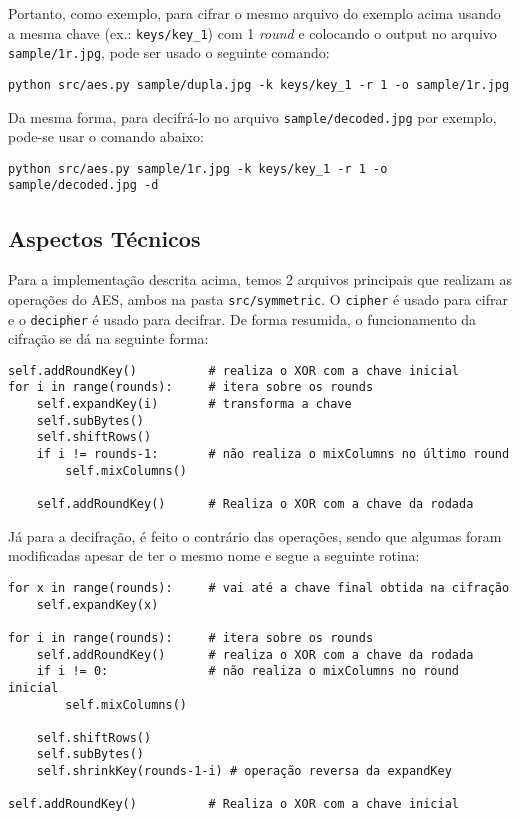 \documentclass[12pt]{article}
\begin{document}
Portanto, como exemplo, para cifrar o mesmo arquivo do exemplo acima usando a mesma chave (ex.: \texttt{keys/key\_1}) com 1 \textit{round} e colocando o output no arquivo \texttt{sample/1r.jpg}, pode ser usado o seguinte comando:

\begin{lstlisting}
python src/aes.py sample/dupla.jpg -k keys/key_1 -r 1 -o sample/1r.jpg
\end{lstlisting}

Da mesma forma, para decifrá-lo no arquivo \texttt{sample/decoded.jpg} por exemplo, pode-se usar o comando abaixo:

\begin{lstlisting}
python src/aes.py sample/1r.jpg -k keys/key_1 -r 1 -o sample/decoded.jpg -d
\end{lstlisting}

\subsection{Aspectos Técnicos}
Para a implementação descrita acima, temos 2 arquivos principais que realizam as operações do AES, ambos na pasta \texttt{src/symmetric}. O \texttt{cipher} é usado para cifrar e o \texttt{decipher} é usado para decifrar. De forma resumida, o funcionamento da cifração se dá na seguinte forma:

\begin{lstlisting}
self.addRoundKey()          # realiza o XOR com a chave inicial
for i in range(rounds):     # itera sobre os rounds
    self.expandKey(i)       # transforma a chave
    self.subBytes()
    self.shiftRows()
    if i != rounds-1:       # não realiza o mixColumns no último round
        self.mixColumns()
    
    self.addRoundKey()      # Realiza o XOR com a chave da rodada
\end{lstlisting}

Já para a decifração, é feito o contrário das operações, sendo que algumas foram modificadas apesar de ter o mesmo nome e segue a seguinte rotina:

\begin{lstlisting}
for x in range(rounds):     # vai até a chave final obtida na cifração
    self.expandKey(x)

for i in range(rounds):     # itera sobre os rounds
    self.addRoundKey()      # realiza o XOR com a chave da rodada
    if i != 0:              # não realiza o mixColumns no round inicial
        self.mixColumns()

    self.shiftRows()
    self.subBytes()
    self.shrinkKey(rounds-1-i) # operação reversa da expandKey
    
self.addRoundKey()          # Realiza o XOR com a chave inicial
\end{lstlisting}
\end{document}
